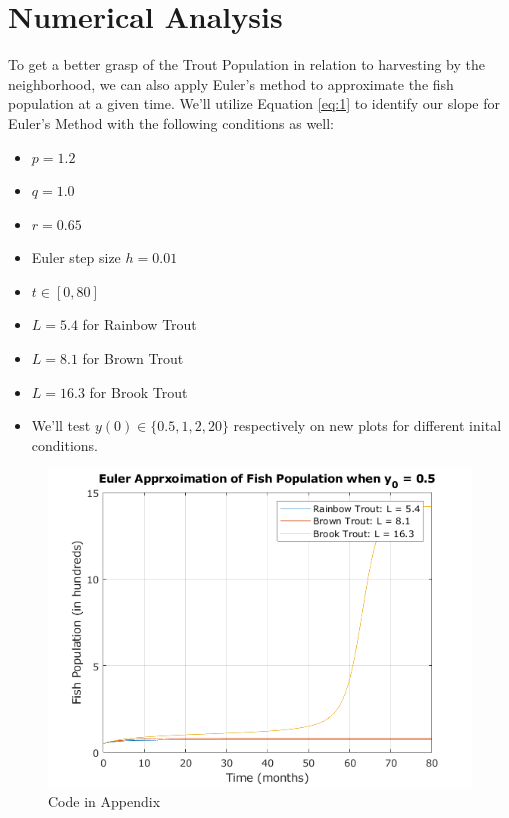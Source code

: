 \documentclass[letterpaper,12pt]{article}
\begin{document}
\section{Numerical Analysis} 
To get a better grasp of the Trout Population in relation to harvesting by the neighborhood, we can also apply Euler's method to approximate the fish population at a given time. 
We'll utilize Equation \eqref{eq:1} to identify our slope for Euler's Method with the following conditions as well:
\begin{itemize}
    \item \(p = 1.2\)
    \item \(q = 1.0\)
    \item \(r = 0.65\)
    \item Euler step size \(h = 0.01\)
    \item \(t \in [0,80]\)
    \item \(L = 5.4\) for Rainbow Trout
    \item \(L = 8.1\) for Brown Trout
    \item \(L = 16.3\) for Brook Trout
    \item We'll test \(y(0) \in \{0.5,1,2,20\}\) respectively on new plots for different inital conditions.
\end{itemize}
\begin{figure}[H]
    \centering
    \includegraphics{./figures/fig.4.1.1.png}
    \caption{Code in Appendix}
    \label{fig:7}
\end{figure}
\end{document}
